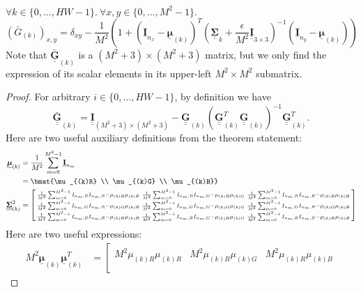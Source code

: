 \documentclass{article}
\def\vt#1{\underline{\mathbf{#1}}}
\def\vts#1{\underline{\boldsymbol{#1}}}
\def\mt#1{\underline{\underline{\mathbf{#1}}}}
\def\mts#1{\underline{\underline{\boldsymbol{#1}}}}
\begin{document}
\begin{lemma}\label{lemma4}
    $\forall k\in\{0,\dots,HW-1\}.\ \forall x,y\in\{0,\dots, M^2-1\}.$
    $$\left({\bar{G}}_{(k)}\right)_{x,y} = \delta_{xy} - \frac1{M^2}\left(1 + \left(\vt{I}_{n_x} - \vts \mu_{(k)}\right)^T \left(\mts \Sigma_k + \frac\epsilon{M^2} \mt{I}_{3\times 3}\right)^{-1} \left(\vt{I}_{n_y} - \vts \mu_{(k)}\right) \right)$$
    Note that $\mt{\bar{G}}_{(k)}$ is a $(M^2+3)\times (M^2+3)$ matrix, but we only find the expression of its scalar elements in its upper-left $M^2\times M^2$ submatrix.
    \begin{proof}
        For arbitrary $i\in\{0,\dots,HW-1\}$, by definition we have
        $$\mt{\bar{G}}_{(k)} = \mt I_{(M^2+3)\times(M^2+3)} - \mt G_{(k)}\left(\mt G_{(k)}^T \mt G_{(k)} \right)^{-1} \mt G_{(k)}^T.$$
        Here are two useful auxiliary definitions from the theorem statement:
        \begin{align*}
            \vts \mu_{(k)} &= \frac1{M^2} \sum_{m=0}^{M^2-1} \vt I_{n_m} \\
            &= \bmat{\mu_{(k)R} \\ \mu_{(k)G} \\ \mu_{(k)B}}\\
            \mts \Sigma^2_{(k)} &= \left[\begin{smallmatrix}
                \frac1{M^2} \sum_{m=0}^{M^2-1} I_{n_m,R}I_{n_m,R} - \mu_{(k)R}\mu_{(k)R} & \frac1{M^2} \sum_{m=0}^{M^2-1} I_{n_m,R}I_{n_m,G} - \mu_{(k)R}\mu_{(k)G} & \frac1{M^2} \sum_{m=0}^{M^2-1} I_{n_m,R}I_{n_m,B} - \mu_{(k)R}\mu_{(k)B}\\
                \frac1{M^2} \sum_{m=0}^{M^2-1} I_{n_m,G}I_{n_m,R} - \mu_{(k)G}\mu_{(k)R} & \frac1{M^2} \sum_{m=0}^{M^2-1} I_{n_m,G}I_{n_m,G} - \mu_{(k)G}\mu_{(k)G} & \frac1{M^2} \sum_{m=0}^{M^2-1} I_{n_m,G}I_{n_m,B} - \mu_{(k)G}\mu_{(k)B}\\
                \frac1{M^2} \sum_{m=0}^{M^2-1} I_{n_m,B}I_{n_m,R} - \mu_{(k)B}\mu_{(k)R} & \frac1{M^2} \sum_{m=0}^{M^2-1} I_{n_m,B}I_{n_m,G} - \mu_{(k)B}\mu_{(k)G} & \frac1{M^2} \sum_{m=0}^{M^2-1} I_{n_m,B}I_{n_m,B} - \mu_{(k)B}\mu_{(k)B}
           \end{smallmatrix}\right]
        \end{align*}
        Here are two useful expressions:
        \begin{align*}
            M^2 \vts\mu_{(k)}\vts\mu_{(k)}^T &= \left[\begin{smallmatrix}
                M^2 \mu_{(k)R}\mu_{(k)R} & M^2 \mu_{(k)R}\mu_{(k)G} & M^2 \mu_{(k)R}\mu_{(k)B} \\

\end{smallmatrix}
\end{align*}
\end{proof}
\end{lemma}
\end{document}
